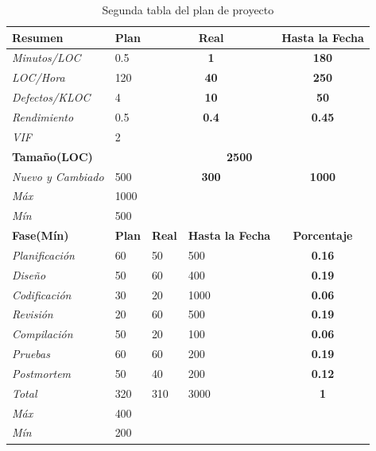 \documentclass[a4paper,12pt,openany,oneside]{book}
\begin{document}
\begin{table}
\begin{tabular}{| l | l | l | l | l | l |}
\hline
\textbf{Resumen} & \textbf{Plan} & \multicolumn{2}{|c|}{\textbf{Real}} & \multicolumn{2}{|c|}{\textbf{Hasta la Fecha}} \\
\hline
\textit{Minutos/LOC} & 0.5 & \multicolumn{2}{|c|}{\textbf{1}} & \multicolumn{2}{|c|}{\textbf{180}} \\
\hline
\textit{LOC/Hora} & 120 & \multicolumn{2}{|c|}{\textbf{40}} & \multicolumn{2}{|c|}{\textbf{250}} \\
\hline
\textit{Defectos/KLOC} & 4 & \multicolumn{2}{|c|}{\textbf{10}} & \multicolumn{2}{|c|}{\textbf{50}} \\
\hline
\textit{Rendimiento} & 0.5 & \multicolumn{2}{|c|}{\textbf{0.4}} & \multicolumn{2}{|c|}{\textbf{0.45}} \\
\hline
\textit{VIF} & 2 & \multicolumn{2}{|c|}{\textbf{}} & \multicolumn{2}{|c|}{\textbf{}} \\
\hline
\textbf{Tamaño(LOC)} & \multicolumn{5}{|c|}{\textbf{2500}}\\
\hline
\textit{Nuevo y Cambiado} & 500 & \multicolumn{2}{|c|}{\textbf{300}} & \multicolumn{2}{|c|}{\textbf{1000}} \\
\hline
\textit{Máx} & 1000 & \multicolumn{4}{|c|}{\textbf{}}\\
\hline
\textit{Mín} & 500  & \multicolumn{4}{|c|}{\textbf{}}\\
\hline
\textbf{Fase(Mín)} & \textbf{Plan} & \textbf{Real} & \textbf{Hasta la Fecha} & \multicolumn{2}{|c|}{\textbf{Porcentaje}} \\
\hline
\textit{Planificación} & 60 & 50  & 500  & \multicolumn{2}{|c|}{\textbf{0.16}}\\
\hline
\textit{Diseño} &        50 & 60  & 400  & \multicolumn{2}{|c|}{\textbf{0.19}}\\
\hline
\textit{Codificación} &  30 & 20  & 1000 & \multicolumn{2}{|c|}{\textbf{0.06}}\\
\hline
\textit{Revisión} &      20 & 60  & 500  & \multicolumn{2}{|c|}{\textbf{0.19}}\\
\hline
\textit{Compilación} &   50 & 20  & 100  & \multicolumn{2}{|c|}{\textbf{0.06}}\\
\hline
\textit{Pruebas} &       60 & 60  & 200  & \multicolumn{2}{|c|}{\textbf{0.19}}\\
\hline
\textit{Postmortem} &    50 & 40  & 200  & \multicolumn{2}{|c|}{\textbf{0.12}}\\
\hline
\textit{Total} &		320 & 310 & 3000 & \multicolumn{2}{|c|}{\textbf{1}}\\
\hline
\textit{Máx} & 			400	& \multicolumn{4}{|c|}{\textbf{}}\\
\hline
\textit{Mín} & 			200 & \multicolumn{4}{|c|}{\textbf{}}\\
\hline
\end{tabular}
\caption{Segunda tabla del plan de proyecto}
\end{table}
\end{document}
